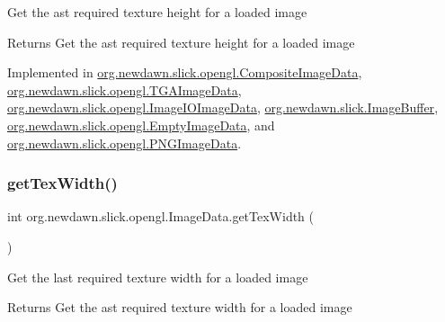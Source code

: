 Get the ast required texture height for a loaded image

\begin{DoxyReturn}{Returns}
Get the ast required texture height for a loaded image 
\end{DoxyReturn}


Implemented in \mbox{\hyperlink{classorg_1_1newdawn_1_1slick_1_1opengl_1_1_composite_image_data_ac0733bc4b03bf553a9374b858343a0f0}{org.\+newdawn.\+slick.\+opengl.\+Composite\+Image\+Data}}, \mbox{\hyperlink{classorg_1_1newdawn_1_1slick_1_1opengl_1_1_t_g_a_image_data_a787a45da7ec0d249ff4ab5db7784d535}{org.\+newdawn.\+slick.\+opengl.\+T\+G\+A\+Image\+Data}}, \mbox{\hyperlink{classorg_1_1newdawn_1_1slick_1_1opengl_1_1_image_i_o_image_data_a771cf308dff01137431513eb48497cd2}{org.\+newdawn.\+slick.\+opengl.\+Image\+I\+O\+Image\+Data}}, \mbox{\hyperlink{classorg_1_1newdawn_1_1slick_1_1_image_buffer_a2a4f40e965941b68ce3c47c57ab330a3}{org.\+newdawn.\+slick.\+Image\+Buffer}}, \mbox{\hyperlink{classorg_1_1newdawn_1_1slick_1_1opengl_1_1_empty_image_data_a2b9c2b476faf9f62c172cd8b20350101}{org.\+newdawn.\+slick.\+opengl.\+Empty\+Image\+Data}}, and \mbox{\hyperlink{classorg_1_1newdawn_1_1slick_1_1opengl_1_1_p_n_g_image_data_aae4743c9696538fdb2717bf7d5a70d0b}{org.\+newdawn.\+slick.\+opengl.\+P\+N\+G\+Image\+Data}}.

\mbox{\label{interfaceorg_1_1newdawn_1_1slick_1_1opengl_1_1_image_data_abf26e8dcbf2ec52f9a49535d8912263e}} 
\subsubsection{\texorpdfstring{get\+Tex\+Width()}{getTexWidth()}}
{\footnotesize\ttfamily int org.\+newdawn.\+slick.\+opengl.\+Image\+Data.\+get\+Tex\+Width (\begin{DoxyParamCaption}{ }\end{DoxyParamCaption})}

Get the last required texture width for a loaded image

\begin{DoxyReturn}{Returns}
Get the ast required texture width for a loaded image 
\end{DoxyReturn}


